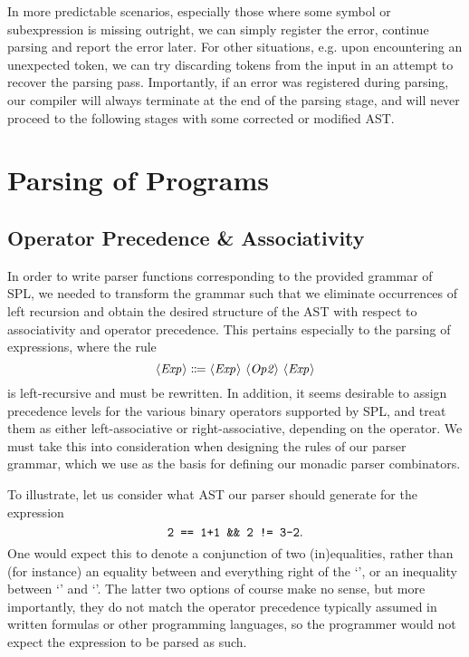 In more predictable scenarios, especially those where some symbol or
subexpression is missing outright, we can simply register the error, continue
parsing and report the error later.
For other situations, e.g. upon encountering an unexpected token, we can try
discarding tokens from the input in an attempt to recover the parsing pass.
Importantly, if an error was registered during parsing, our compiler will always
terminate at the end of the parsing stage, and will never proceed to the
following stages with some corrected or modified AST.



\section{Parsing of Programs} \label{sec:parsing-programs}

\subsection{Operator Precedence \& Associativity}

In order to write parser functions corresponding to the provided grammar of SPL,
we needed to transform the grammar such that we eliminate occurrences of left
recursion and obtain the desired structure of the AST with respect to
associativity and operator precedence.
This pertains especially to the parsing of expressions, where the rule
\[ \NT{Exp} \Coloneqq \NT{Exp}\ \NT{Op2}\ \NT{Exp} \]
is left-recursive and must be rewritten.
In addition, it seems desirable to assign precedence levels for the various
binary operators supported by SPL, and treat them as either left-associative or
right-associative, depending on the operator.
We must take this into consideration when designing the rules of our parser
grammar, which we use as the basis for defining our monadic parser combinators.

To illustrate, let us consider what AST our parser should generate for the
expression
\[ \texttt{2 == 1+1 \&\& 2 != 3-2} .\]
One would expect this to denote a conjunction of two (in)equalities, rather than
(for instance) an equality between  and everything right of the
`\code{==}', or an inequality between `' and `'.
%
The latter two options of course make no sense, but more importantly, they do
not match the operator precedence typically assumed in written formulas or other
programming languages, so the programmer would not expect the expression to be
parsed as such.


